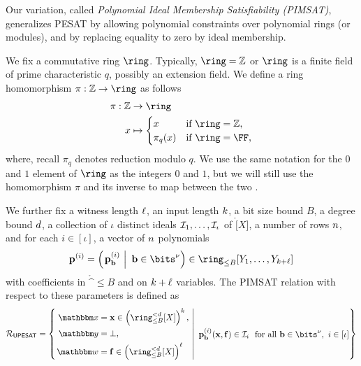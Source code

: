 \documentclass[11pt,letterpaper,usenames,dvipsnames]{article}
\begin{document}
Our variation, called \emph{Polynomial Ideal Membership Satisfiability (PIMSAT)}, generalizes PESAT by allowing polynomial constraints over polynomial rings (or modules), and by replacing equality to zero by ideal membership. %



We fix a commutative ring $\ring$. Typically, $\ring=\ZZ$ or $\ring$ is a finite field of prime characteristic $q$, possibly an extension field.  We define a ring homomorphism $\pi:\ZZ \to \ring$ as follows 
\begin{align*}
\pi: \ZZ &\to \ring\\
x &\mapsto \begin{cases}
x & \text{if } \ring=\ZZ,\\
\pi_q(x) & \text{if } \ring=\FF,
\end{cases}
\end{align*}
where, recall $\pi_q$ denotes reduction modulo $q$.  We use the same notation for the $0$ and $1$ element of $\ring$ as the integers $0$ and $1$, but we will still use the homomorphism $\pi$ and its inverse to map between the two .



We further fix a witness length $\ell$, an input length $k$, a bit size bound $B$, a degree bound $d$, a collection of $\iota$ distinct ideals $\mathcal{I}_1, \ldots, \mathcal{I}_{\iota}$ of $\ring[X]$, a number of rows $n$, and for each $i\in [\iota]$, a vector of $n$ polynomials $$\mathbf{p}^{(i)} = \left(\left.\mathbf{p}_{\bb}^{(i)} \ \right| \ \bb\in \bits^\nu\right) \in \ringbitbound{B}[Y_1,\ldots, Y_{\inplen+\codedim}]$$ with coefficients in $\ring^{\leq B}$ and on $k + \ell$ variables. The PIMSAT relation with respect to these parameters is defined as
$$
\PIMSAT = \left\{\left. 
\begin{aligned}
    \inp &= \xx \in \left(\ringtwobounds{B}{\moduledegree}[X]\right)^{\inplen},\\
    \oracle &= \bot ,\\
    \wit &=\bff \in \left(\ringtwobounds{B}{\moduledegree}[X]\right)^\codedim
\end{aligned} 
\ \right| \ 
\begin{aligned}
    \mathbf{p}_{\bb}^{(i)}(\xx, \bff) \in \ideal_i \ \text{ for all } \bb\in \bits^\nu, \ i \in [\iota]
\end{aligned}
\right\}
$$
\end{document}

